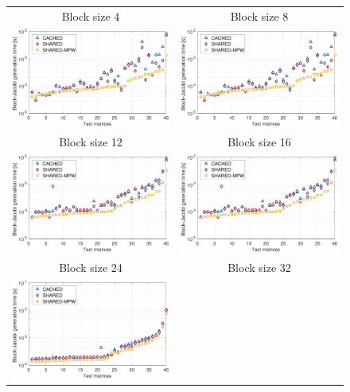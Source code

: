 \begin{figure}
\begin{center}
{\scriptsize
\begin{tabular}{cc}
\hline
Block size 4 & Block size 8\\
\includegraphics[width=.46\columnwidth]{plots/BJ_generation_time_4.pdf}&
\includegraphics[width=.46\columnwidth]{plots/BJ_generation_time_8.pdf}\\
\hline
Block size 12 & Block size 16\\
\includegraphics[width=.46\columnwidth]{plots/BJ_generation_time_12.pdf}&
\includegraphics[width=.46\columnwidth]{plots/BJ_generation_time_16.pdf}\\
\hline
Block size 24 & Block size 32\\
\includegraphics[width=.46\columnwidth]{plots/BJ_generation_time_24.pdf}&

\end{tabular}}
\end{center}
\end{figure}
